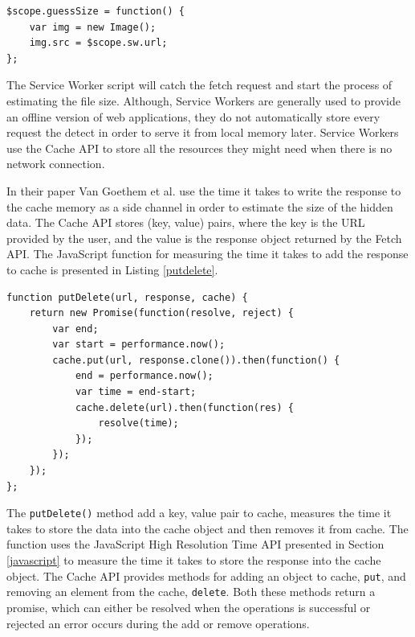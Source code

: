 \documentclass[10pt,a4paper,twoside]{book}
\begin{document}

\begin{lstlisting}[caption={Loading file as an Image},label={SWimg}]
$scope.guessSize = function() {
	var img = new Image();
	img.src = $scope.sw.url;
};
\end{lstlisting}

The Service Worker script will catch the fetch request and start the process of estimating the file size. Although, Service Workers are generally used to provide an offline version of web applications, they do not automatically store every request the detect in order to serve it from local memory later. Service Workers use the Cache API \cite{cacheAPI} to store all the resources they might need when there is no network connection.

In their paper Van Goethem et al. \cite{van2015clock} use the time it takes to write the response to the cache memory as a side channel in order to estimate the size of the hidden data. The Cache API stores (key, value) pairs, where the key is the URL provided by the user, and the value is the response object returned by the Fetch API. The JavaScript function for measuring the time it takes to add the response to cache is presented in Listing \ref{putdelete}. 


\begin{lstlisting}[caption={JavaScript code for measuring the time it takes to write to cache.},label={putdelete}]
function putDelete(url, response, cache) {
    return new Promise(function(resolve, reject) {
        var end;
        var start = performance.now();
        cache.put(url, response.clone()).then(function() {
            end = performance.now();
            var time = end-start;
            cache.delete(url).then(function(res) {
                resolve(time);
            });
        });
    });
};
\end{lstlisting}

The \texttt{putDelete()} method add a key, value pair to cache, measures the time it takes to store the data into the cache object and then removes it from cache. The function uses the JavaScript High Resolution Time API presented in Section \ref{javascript} to measure the time it takes to store the response into the cache object. The Cache API provides methods for adding an object to cache, \texttt{put}, and removing an element from the cache, \texttt{delete}. Both these methods return a promise, which can either be resolved when the operations is successful or rejected an error occurs during the add or remove operations.  
\end{document}
